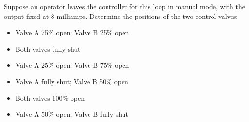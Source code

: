 Suppose an operator leaves the controller for this loop in manual mode, with the output fixed at 8 milliamps.  Determine the positions of the two control valves:

\begin{itemize}
\item{} Valve A 75\% open; Valve B 25\% open
\vskip 5pt 
\item{} Both valves fully shut
\vskip 5pt 
\item{} Valve A 25\% open; Valve B 75\% open
\vskip 5pt 
\item{} Valve A fully shut; Valve B 50\% open
\vskip 5pt 
\item{} Both valves 100\% open
\vskip 5pt 
\item{} Valve A 50\% open; Valve B fully shut
\end{itemize}






